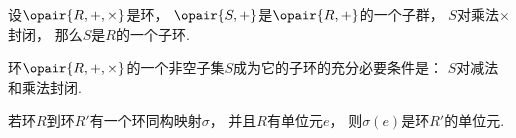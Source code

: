 \begin{proposition}
设\(\opair{R,+,\times}\)是环，
\(\opair{S,+}\)是\(\opair{R,+}\)的一个子群，
\(S\)对乘法\(\times\)封闭，
那么\(S\)是\(R\)的一个子环.
\end{proposition}

\begin{proposition}
环\(\opair{R,+,\times}\)的一个非空子集\(S\)成为它的子环的充分必要条件是：
\(S\)对减法和乘法封闭.
\end{proposition}

\begin{proposition}
若环\(R\)到环\(R'\)有一个环同构映射\(\sigma\)，
并且\(R\)有单位元\(e\)，
则\(\sigma(e)\)是环\(R'\)的单位元.
\end{proposition}
